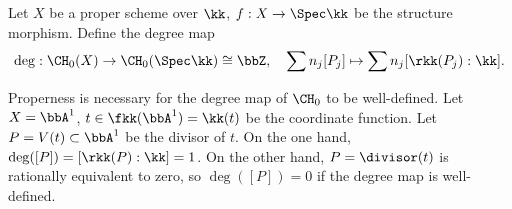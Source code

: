     \begin{definition}
        Let \(X\) be a proper scheme over \(\kk\), \(f:X \to \Spec \kk\) be the structure morphism.
        Define the degree map
        \[ \deg: \CH_0(X) \to \CH_0(\Spec \kk) \cong \bbZ, \quad \sum n_j [P_j] \mapsto \sum n_j [\rkk(P_j):\kk]. \]
    \end{definition}

    \begin{example}
        Properness is necessary for the degree map of \(\CH_0\) to be well-defined.
        Let \(X = \bbA^1\), \(t \in \fkk(\bbA^1) = \kk(t)\) be the coordinate function.
        Let \(P = V(t) \subset \bbA^1\) be the divisor of \(t\). 
        On the one hand, \(\deg([P]) = [\rkk(P):\kk] = 1\).
        On the other hand, \(P = \divisor(t)\) is rationally equivalent to zero, so \(\deg([P]) = 0\) if the degree map is well-defined.
    \end{example}
    